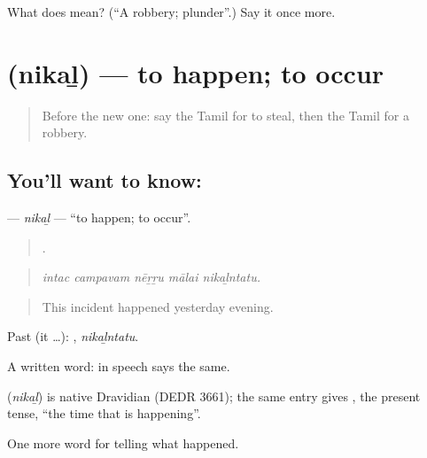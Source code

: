 \begin{tcolorbox}[breakable,colback=teal!4,colframe=teal!35!black,title={Before you move on}]
What does  mean? (\textquotedblleft{}A robbery; plunder\textquotedblright{}.) Say it once more.
\end{tcolorbox}
\section[\texorpdfstring{\ta{நிகழ்} (nikaḻ)}{நிகழ் (nikaḻ)}]{ (nikaḻ) — to happen; to occur}

\label{lesson:TA-C294-nikal}



\begin{quote}
Before the new one: say the Tamil for to steal, then the Tamil for a robbery.
\end{quote}

\subsection*{You'll want to know: }
\textbf{} — \emph{nikaḻ} — \textquotedblleft{}to happen; to occur\textquotedblright{}.

\begin{quote}
    .
\end{quote}

\begin{quote}
\emph{intac campavam nēṟṟu mālai nikaḻntatu.}
\end{quote}

\begin{quote}
This incident happened yesterday evening.
\end{quote}

Past (it …): , \emph{nikaḻntatu}.

A written word: in speech  says the same.

\begin{cousinweb}
\textbf{} (\emph{nikaḻ}) is native Dravidian (DEDR 3661); the same entry gives  , the present tense, \textquotedblleft{}the time that is happening\textquotedblright{}.
\end{cousinweb}

\begin{grammarlens}[title={What you've built}]
One more word for telling what happened.
\end{grammarlens}

